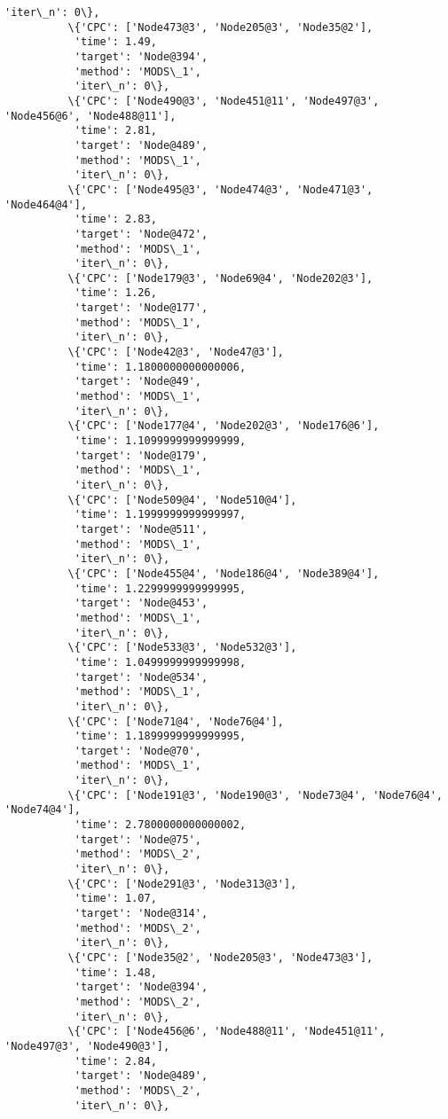 \documentclass[11pt]{article}
\begin{document}
\begin{Verbatim}[commandchars=\\\{\}]
           'iter\_n': 0\},
          \{'CPC': ['Node473@3', 'Node205@3', 'Node35@2'],
           'time': 1.49,
           'target': 'Node@394',
           'method': 'MODS\_1',
           'iter\_n': 0\},
          \{'CPC': ['Node490@3', 'Node451@11', 'Node497@3', 'Node456@6', 'Node488@11'],
           'time': 2.81,
           'target': 'Node@489',
           'method': 'MODS\_1',
           'iter\_n': 0\},
          \{'CPC': ['Node495@3', 'Node474@3', 'Node471@3', 'Node464@4'],
           'time': 2.83,
           'target': 'Node@472',
           'method': 'MODS\_1',
           'iter\_n': 0\},
          \{'CPC': ['Node179@3', 'Node69@4', 'Node202@3'],
           'time': 1.26,
           'target': 'Node@177',
           'method': 'MODS\_1',
           'iter\_n': 0\},
          \{'CPC': ['Node42@3', 'Node47@3'],
           'time': 1.1800000000000006,
           'target': 'Node@49',
           'method': 'MODS\_1',
           'iter\_n': 0\},
          \{'CPC': ['Node177@4', 'Node202@3', 'Node176@6'],
           'time': 1.1099999999999999,
           'target': 'Node@179',
           'method': 'MODS\_1',
           'iter\_n': 0\},
          \{'CPC': ['Node509@4', 'Node510@4'],
           'time': 1.1999999999999997,
           'target': 'Node@511',
           'method': 'MODS\_1',
           'iter\_n': 0\},
          \{'CPC': ['Node455@4', 'Node186@4', 'Node389@4'],
           'time': 1.2299999999999995,
           'target': 'Node@453',
           'method': 'MODS\_1',
           'iter\_n': 0\},
          \{'CPC': ['Node533@3', 'Node532@3'],
           'time': 1.0499999999999998,
           'target': 'Node@534',
           'method': 'MODS\_1',
           'iter\_n': 0\},
          \{'CPC': ['Node71@4', 'Node76@4'],
           'time': 1.1899999999999995,
           'target': 'Node@70',
           'method': 'MODS\_1',
           'iter\_n': 0\},
          \{'CPC': ['Node191@3', 'Node190@3', 'Node73@4', 'Node76@4', 'Node74@4'],
           'time': 2.7800000000000002,
           'target': 'Node@75',
           'method': 'MODS\_2',
           'iter\_n': 0\},
          \{'CPC': ['Node291@3', 'Node313@3'],
           'time': 1.07,
           'target': 'Node@314',
           'method': 'MODS\_2',
           'iter\_n': 0\},
          \{'CPC': ['Node35@2', 'Node205@3', 'Node473@3'],
           'time': 1.48,
           'target': 'Node@394',
           'method': 'MODS\_2',
           'iter\_n': 0\},
          \{'CPC': ['Node456@6', 'Node488@11', 'Node451@11', 'Node497@3', 'Node490@3'],
           'time': 2.84,
           'target': 'Node@489',
           'method': 'MODS\_2',
           'iter\_n': 0\},

\end{Verbatim}
\end{document}
